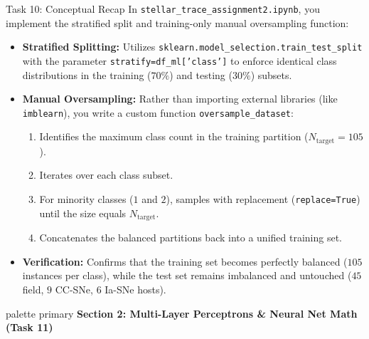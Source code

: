 \documentclass[9pt]{beamer}
\begin{document}
\begin{frame}{Task 10: Conceptual Recap}
  In \texttt{stellar\_trace\_assignment2.ipynb}, you implement the stratified split and training-only manual oversampling function:
  \begin{itemize}
    \item \textbf{Stratified Splitting:} Utilizes \texttt{sklearn.model\_selection.train\_test\_split} with the parameter \texttt{stratify=df\_ml['class']} to enforce identical class distributions in the training ($70\%$) and testing ($30\%$) subsets.
    \item \textbf{Manual Oversampling:} Rather than importing external libraries (like \texttt{imblearn}), you write a custom function \texttt{oversample\_dataset}:
      \begin{enumerate}
        \item Identifies the maximum class count in the training partition ($N_{\text{target}} = 105$).
        \item Iterates over each class subset.
        \item For minority classes ($1$ and $2$), samples with replacement (\texttt{replace=True}) until the size equals $N_{\text{target}}$.
        \item Concatenates the balanced partitions back into a unified training set.
      \end{enumerate}
    \item \textbf{Verification:} Confirms that the training set becomes perfectly balanced ($105$ instances per class), while the test set remains imbalanced and untouched ($45$ field, $9$ CC-SNe, $6$ Ia-SNe hosts).
  \end{itemize}
\end{frame}

\begin{frame}[plain]
  \vfill
  \centering
  \begin{beamercolorbox}[sep=8pt,center,shadow=true,rounded=true]{palette primary}
    \textbf{Section 2: Multi-Layer Perceptrons \& Neural Net Math (Task 11)}
  \end{beamercolorbox}
  \vfill
\end{frame}
\end{document}
